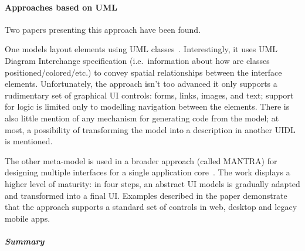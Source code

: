 \paragraph{Approaches based on UML}

Two papers presenting this approach have been found.

One models layout elements using UML classes~\cite{Blankenhorn2004-og}.
Interestingly, it uses UML Diagram Interchange specification (i.e.~information about how are classes positioned/colored/etc.) to convey spatial relationships between the interface elements.
Unfortunately, the approach isn't too advanced\,\textemdash\,it only supports a rudimentary set of graphical UI controls: forms, links, images, and text;
support for logic is limited only to modelling navigation between the elements.
There is also little mention of any mechanism for generating code from the model;
at most, a possibility of transforming the model into a description in another UIDL is mentioned.

The other meta-model is used in a broader approach (called MANTRA) for designing multiple interfaces for a single application core~\cite{Botterweck2011-ra}.
The work displays a higher level of maturity: in four steps, an abstract UI models is gradually adapted and transformed into a final UI\@.
Examples described in the paper demonstrate that the approach supports a standard set of controls in web, desktop and legacy mobile apps.

\subparagraph{Summary}

